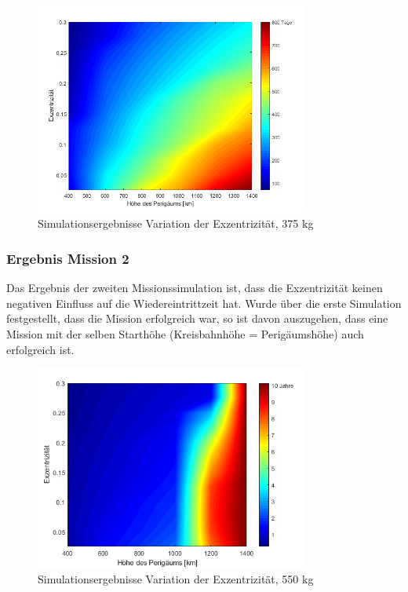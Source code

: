 	\begin{figure}[h]
	\centering
		\includegraphics[width=0.80\textwidth]{./graphics/GMAT/ecc_perigee_375kg.png}
		\caption{Simulationsergebnisse Variation der Exzentrizität, 375 kg}
	\label{fig:GMAT_ecc_b}
\end{figure}

\subsubsection{Ergebnis Mission 2}
Das Ergebnis der zweiten Missionssimulation ist, dass die Exzentrizität keinen negativen Einfluss auf die Wiedereintrittzeit hat. Wurde über die erste Simulation festgestellt, dass die Mission erfolgreich war, so ist davon auszugehen, dass eine Mission mit der selben Starthöhe (Kreisbahnhöhe = Perigäumshöhe) auch erfolgreich ist.

\begin{figure}[h]
	\centering
		\includegraphics[width=0.80\textwidth]{./graphics/GMAT/ecc_perigee_550kg.png}
		\caption{Simulationsergebnisse Variation der Exzentrizität, 550 kg}
	\label{fig:GMAT_ecc_c}
\end{figure}


